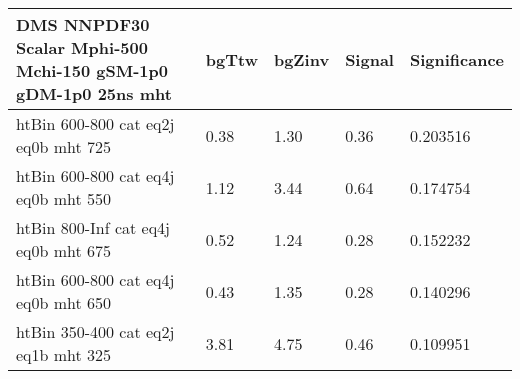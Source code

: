  \begin{tabular}{|l|l|l|l|l|}
  \footnotesize
   \label{mostSensitiveBins_DMS_NNPDF30_Scalar_Mphi-500_Mchi-150_gSM-1p0_gDM-1p0_25ns}
	\textbf{DMS NNPDF30 Scalar Mphi-500 Mchi-150 gSM-1p0 gDM-1p0 25ns mht}	 & 	bgTtw	 & 	bgZinv	 & 	Signal &	 Significance \\ 
	\hline
	htBin 600-800 cat eq2j eq0b mht 725 & 	0.38	 & 	1.30	 & 	0.36 	&0.203516 \\ 
	htBin 600-800 cat eq4j eq0b mht 550 & 	1.12	 & 	3.44	 & 	0.64 	&0.174754 \\ 
	htBin 800-Inf cat eq4j eq0b mht 675 & 	0.52	 & 	1.24	 & 	0.28 	&0.152232 \\ 
	htBin 600-800 cat eq4j eq0b mht 650 & 	0.43	 & 	1.35	 & 	0.28 	&0.140296 \\ 
	htBin 350-400 cat eq2j eq1b mht 325 & 	3.81	 & 	4.75	 & 	0.46 	&0.109951 \\ 
\end{tabular}
